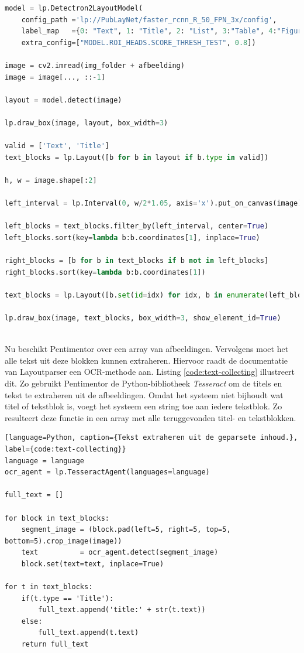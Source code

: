 \begin{lstlisting}[language=Python, caption={Een PDF inlezen met OCR}, label={code:reader-ocr}]
model = lp.Detectron2LayoutModel(
	config_path ='lp://PubLayNet/faster_rcnn_R_50_FPN_3x/config',
	label_map   ={0: "Text", 1: "Title", 2: "List", 3:"Table", 4:"Figure"}, 
	extra_config=["MODEL.ROI_HEADS.SCORE_THRESH_TEST", 0.8])

image = cv2.imread(img_folder + afbeelding)
image = image[..., ::-1]
	
layout = model.detect(image)
	
lp.draw_box(image, layout, box_width=3)
	
valid = ['Text', 'Title']
text_blocks = lp.Layout([b for b in layout if b.type in valid])
	
h, w = image.shape[:2]
	
left_interval = lp.Interval(0, w/2*1.05, axis='x').put_on_canvas(image)
	
left_blocks = text_blocks.filter_by(left_interval, center=True)
left_blocks.sort(key=lambda b:b.coordinates[1], inplace=True)
	
right_blocks = [b for b in text_blocks if b not in left_blocks]
right_blocks.sort(key=lambda b:b.coordinates[1])
	
text_blocks = lp.Layout([b.set(id=idx) for idx, b in enumerate(left_blocks+right_blocks)])
	
lp.draw_box(image, text_blocks, box_width=3, show_element_id=True)
	
\end{lstlisting}

Nu beschikt Pentimentor over een array van afbeeldingen. Vervolgens moet het alle tekst uit deze blokken kunnen extraheren. Hiervoor raadt de documentatie van Layoutparser een OCR-methode aan. Listing \ref{code:text-collecting} illustreert dit. Zo gebruikt Pentimentor de Python-bibliotheek \textit{Tesseract} om de titels en tekst te extraheren uit de afbeeldingen. Omdat het systeem niet bijhoudt wat titel of tekstblok is, voegt het systeem een string toe aan iedere tekstblok. Zo resulteert deze functie in een array met alle teruggevonden titel- en tekstblokken.

\begin{lstlisting}[language=Python, caption={Tekst extraheren uit de geparsete inhoud.}, label={code:text-collecting}}
language = language
ocr_agent = lp.TesseractAgent(languages=language)

full_text = []
	
for block in text_blocks:
	segment_image = (block.pad(left=5, right=5, top=5, bottom=5).crop_image(image))
	text          = ocr_agent.detect(segment_image)
	block.set(text=text, inplace=True)
	
for t in text_blocks:
	if(t.type == 'Title'):
		full_text.append('title:' + str(t.text))
	else:
		full_text.append(t.text)    
	return full_text
\end{lstlisting}


